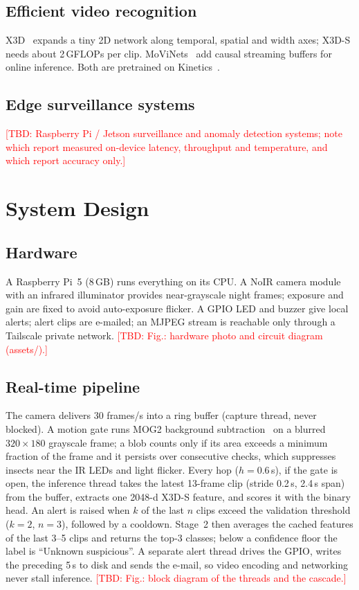 \documentclass[journal]{IEEEtran}
\newcommand{\TBD}[1]{\textcolor{red}{[TBD: #1]}}
\begin{document}
\subsection{Efficient video recognition}
X3D~\cite{feichtenhofer2020x3d} expands a tiny 2D network along temporal, spatial and width axes;
X3D-S needs about 2\,GFLOPs per clip. MoViNets~\cite{kondratyuk2021movinets} add causal streaming
buffers for online inference. Both are pretrained on Kinetics~\cite{kay2017kinetics}.

\subsection{Edge surveillance systems}
\TBD{Raspberry Pi / Jetson surveillance and anomaly detection systems; note which report
measured on-device latency, throughput and temperature, and which report accuracy only.}

\section{System Design}\label{sec:system}
\subsection{Hardware}
A Raspberry Pi~5 (8\,GB) runs everything on its CPU. A NoIR camera module with an infrared
illuminator provides near-grayscale night frames; exposure and gain are fixed to avoid
auto-exposure flicker. A GPIO LED and buzzer give local alerts; alert clips are e-mailed; an
MJPEG stream is reachable only through a Tailscale private network.
\TBD{Fig.: hardware photo and circuit diagram (assets/).}

\subsection{Real-time pipeline}
The camera delivers 30 frames/s into a ring buffer (capture thread, never blocked). A motion
gate runs MOG2 background subtraction~\cite{zivkovic2004} on a blurred $320\times180$ grayscale
frame; a blob counts only if its area exceeds a minimum fraction of the frame and it persists
over consecutive checks, which suppresses insects near the IR LEDs and light flicker. Every hop
($h=0.6$\,s), if the gate is open, the inference thread takes the latest 13-frame clip (stride
0.2\,s, 2.4\,s span) from the buffer, extracts one 2048-d X3D-S feature, and scores it with the
binary head. An alert is raised when $k$ of the last $n$ clips exceed the validation threshold
($k{=}2$, $n{=}3$), followed by a cooldown. Stage~2 then averages the cached features of the last
3--5 clips and returns the top-3 classes; below a confidence floor the label is ``Unknown
suspicious''. A separate alert thread drives the GPIO, writes the preceding 5\,s to disk and
sends the e-mail, so video encoding and networking never stall inference.
\TBD{Fig.: block diagram of the threads and the cascade.}
\end{document}

